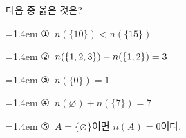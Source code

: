 다음 중 옳은 것은?
\par\medskip\par\noindent\hangindent=1.4em {\small ①}\ $n(\{10\})<n(\{15\})$\par\noindent\hangindent=1.4em {\small ②}\ $n(\{1{,}\mkern3mu\mathopen{}2{,}\mkern3mu\mathopen{}3\})-n(\{1{,}\mkern3mu\mathopen{}2\})=3$\par\noindent\hangindent=1.4em {\small ③}\ $n(\{0\})=1$\par\noindent\hangindent=1.4em {\small ④}\ $n(\varnothing)+n(\{7\})=7$\par\noindent\hangindent=1.4em {\small ⑤}\ $A=\{\varnothing\}$이면 $n(A)=0$이다.\par\medskip
